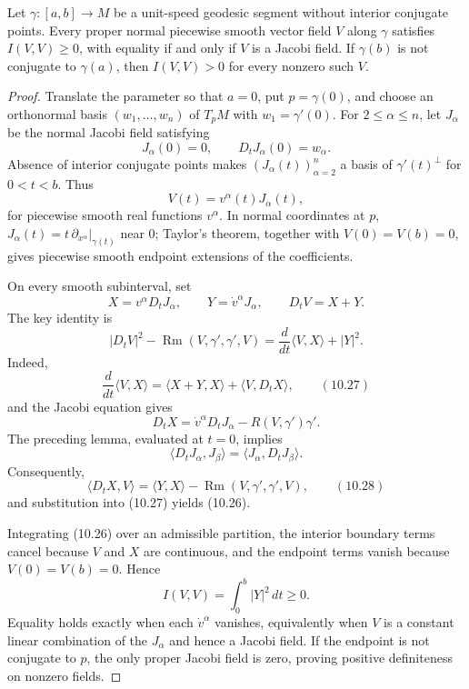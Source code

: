\begin{theorem}
\label{thm:geodesic-without-conjugate-points}

Let $\gamma\colon[a,b]\to M$ be a unit-speed geodesic segment without
interior conjugate points. Every proper normal piecewise smooth vector field
$V$ along $\gamma$ satisfies $I(V,V)\geq0$, with equality if and only if $V$
is a Jacobi field. If $\gamma(b)$ is not conjugate to $\gamma(a)$, then
$I(V,V)>0$ for every nonzero such $V$.
\end{theorem}

\begin{proof}
\sketch Translate the parameter so that $a=0$, put $p=\gamma(0)$, and choose
an orthonormal basis $(w_1,\ldots,w_n)$ of $T_pM$ with
$w_1=\gamma'(0)$. For $2\leq\alpha\leq n$, let $J_\alpha$ be the normal
Jacobi field satisfying
\[
J_\alpha(0)=0,
\qquad D_tJ_\alpha(0)=w_\alpha.
\]
Absence of interior conjugate points makes $(J_\alpha(t))_{\alpha=2}^n$ a
basis of $\gamma'(t)^\perp$ for $0<t<b$. Thus
\begin{equation}
V(t)=v^\alpha(t)J_\alpha(t), \tag{10.25}
\end{equation}
for piecewise smooth real functions $v^\alpha$. In normal coordinates at $p$,
$J_\alpha(t)=t\,\partial_{x^\alpha}|_{\gamma(t)}$ near $0$; Taylor's theorem,
together with $V(0)=V(b)=0$, gives piecewise smooth endpoint extensions of
the coefficients.

On every smooth subinterval, set
\[
X=v^\alpha D_tJ_\alpha,
\qquad
Y=\dot v^\alpha J_\alpha,
\qquad D_tV=X+Y.
\]
The key identity is
\begin{equation}
|D_tV|^2-\operatorname{Rm}(V,\gamma',\gamma',V)
=\frac d{dt}\langle V,X\rangle+|Y|^2. \tag{10.26}
\end{equation}
Indeed,
\[
\frac d{dt}\langle V,X\rangle
=\langle X+Y,X\rangle+\langle V,D_tX\rangle,
\qquad (10.27)
\]
and the Jacobi equation gives
\[
D_tX=\dot v^\alpha D_tJ_\alpha-R(V,\gamma')\gamma'.
\]
The preceding lemma, evaluated at $t=0$, implies
\[
\langle D_tJ_\alpha,J_\beta\rangle
=\langle J_\alpha,D_tJ_\beta\rangle.
\]
Consequently,
\[
\langle D_tX,V\rangle
=\langle Y,X\rangle-\operatorname{Rm}(V,\gamma',\gamma',V),
\qquad (10.28)
\]
and substitution into (10.27) yields (10.26).

Integrating (10.26) over an admissible partition, the interior boundary terms
cancel because $V$ and $X$ are continuous, and the endpoint terms vanish
because $V(0)=V(b)=0$. Hence
\[
I(V,V)=\int_0^b|Y|^2\,dt\geq0.
\]
Equality holds exactly when each $\dot v^\alpha$ vanishes, equivalently when
$V$ is a constant linear combination of the $J_\alpha$ and hence a Jacobi
field. If the endpoint is not conjugate to $p$, the only proper Jacobi field is
zero, proving positive definiteness on nonzero fields.
\end{proof}

